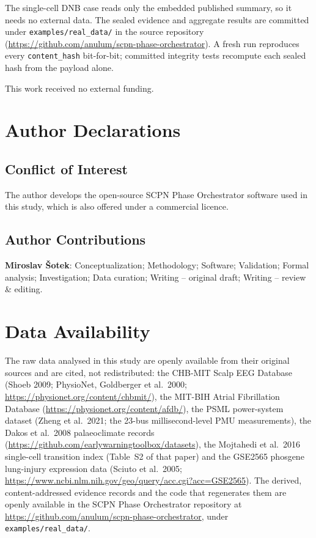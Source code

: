 \documentclass[aip,cha,preprint,amsmath,amssymb]{revtex4-2}
\newcommand{\code}[1]{\texttt{#1}}
\begin{document}
The single-cell DNB case reads only the embedded published summary, so
it needs no external data. The sealed evidence and aggregate results
are committed under \code{examples/real\_data/} in the source
repository (\url{https://github.com/anulum/scpn-phase-orchestrator}). A
fresh run reproduces every \code{content\_hash} bit-for-bit; committed
integrity tests recompute each sealed hash from the payload alone.

\begin{acknowledgments}
This work received no external funding.
\end{acknowledgments}

\section*{Author Declarations}

\subsection*{Conflict of Interest}

The author develops the open-source SCPN Phase Orchestrator software
used in this study, which is also offered under a commercial licence.

\subsection*{Author Contributions}

\textbf{Miroslav \v{S}otek}: Conceptualization; Methodology; Software;
Validation; Formal analysis; Investigation; Data curation;
Writing -- original draft; Writing -- review \& editing.

\section*{Data Availability}

The raw data analysed in this study are openly available from their
original sources and are cited, not redistributed: the CHB-MIT Scalp
EEG Database (Shoeb 2009; PhysioNet, Goldberger et al.\ 2000;
\url{https://physionet.org/content/chbmit/}), the MIT-BIH
Atrial Fibrillation Database (\url{https://physionet.org/content/afdb/}),
the PSML power-system dataset (Zheng et al.\ 2021; the 23-bus
millisecond-level PMU measurements), the Dakos et al.\ 2008
palaeoclimate records (\url{https://github.com/earlywarningtoolbox/datasets}),
the Mojtahedi et al.\ 2016 single-cell transition index (Table~S2 of
that paper) and the GSE2565 phosgene lung-injury expression data
(Sciuto et al.\ 2005; \url{https://www.ncbi.nlm.nih.gov/geo/query/acc.cgi?acc=GSE2565}). The
derived, content-addressed evidence records and the code that
regenerates them are openly available in the SCPN Phase Orchestrator
repository at \url{https://github.com/anulum/scpn-phase-orchestrator},
under \code{examples/real\_data/}.
\end{document}
